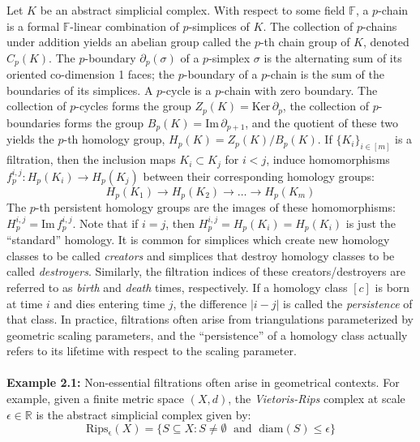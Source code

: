 \documentclass{siamart190516}
\begin{document}
Let $K$ be an abstract simplicial complex. With respect to some field $\mathbb{F}$, a $p$-chain is a
formal $\mathbb{F}$-linear combination  of $p$-simplices of $K$. The collection of $p$-chains under addition yields an abelian group called the $p$-th chain group of $K$, denoted   $C_p(K)$. 
The $p$-boundary $\partial_p(\sigma)$  of a $p$-simplex $\sigma$ is the alternating sum of its oriented co-dimension 1 faces; the $p$-boundary of a $p$-chain is the sum of the boundaries of its simplices. A $p$-cycle is a $p$-chain with zero boundary. The collection of $p$-cycles forms the group $Z_p(K) = \mathrm{Ker}\,\partial_p$, the collection of $p$-boundaries forms the group $B_p(K) = \mathrm{Im}\,\partial_{p+1}$, and the quotient of these two yields the $p$-th homology group, $H_p(K) = Z_p(K) / B_{p}(K)$. 
If $\{K_i\}_{i\in [m]}$ is a filtration, then the inclusion maps  $K_i\subset K_j$  for $i < j$, induce homomorphisms $f_p^{i,j}: H_p(K_i) \to H_p(K_j)$ between their corresponding homology groups:
\begin{equation}
	H_p(K_1) \to H_p(K_2) \to \dots \to H_p(K_m)
\end{equation}
The $p$-th persistent homology groups are the images of these homomorphisms: $H_{p}^{i,j} = \mathrm{Im}\,f_p^{i,j}$. Note that if $i = j$, then $H_{p}^{i,j} = H_{p}(K_i) = H_{p}(K_i)$ is   just the ``standard'' homology. It is common for simplices which create new homology classes to be called \emph{creators} and simplices that destroy homology classes to be called \emph{destroyers}. 
Similarly, the filtration indices of 
these creators/destroyers are referred to as \emph{birth} and \emph{death} times, respectively. 
If a homology class $[c]$ is born at time $i$ and dies entering time $j$, the difference $\lvert i - j \rvert$ is called the \emph{persistence} of that class. In practice, filtrations often arise from triangulations parameterized by geometric scaling parameters, and the ``persistence'' of a homology class actually refers to its lifetime with respect to the scaling parameter. 
\\
\\
\noindent \textbf{Example 2.1:} Non-essential filtrations often arise in geometrical contexts. For example, given a finite metric space $(X, d)$, the \emph{Vietoris-Rips} complex at scale $\epsilon \in \mathbb{R}$ is the abstract simplicial complex given by: 
\begin{equation}\label{eq:rips}
	\mathrm{Rips_\epsilon}(X) = \{ S \subseteq X : S \neq \emptyset \;\mbox{ and }\;\mathrm{diam}(S) \leq \epsilon \}
\end{equation} 
\end{document}

